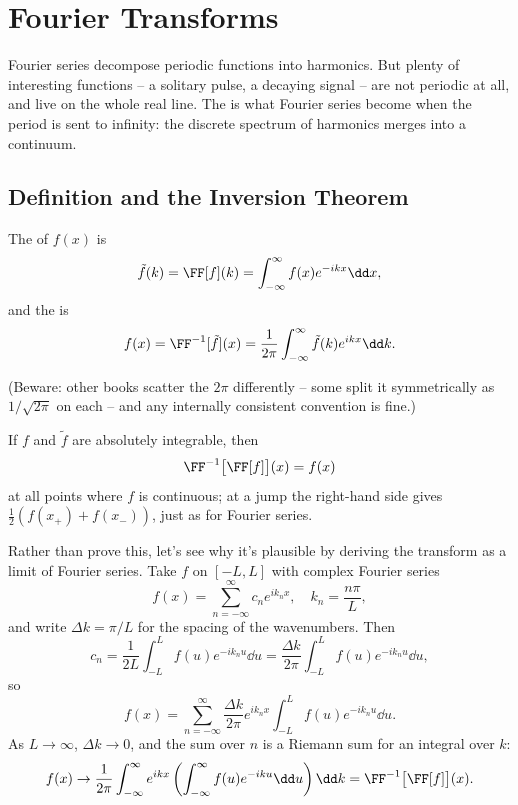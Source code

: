 \section{Fourier Transforms}

Fourier series decompose periodic functions into harmonics. But plenty of interesting functions -- a solitary pulse, a decaying signal -- are not periodic at all, and live on the whole real line. The  is what Fourier series become when the period is sent to infinity: the discrete spectrum of harmonics merges into a continuum.

\subsection{Definition and the Inversion Theorem}

\begin{definition}
    The  of $f(x)$ is
    $$
    \tilde{f}(k) = \FF[f](k) = \int_{-\infty}^{\infty} f(x) e^{-ikx} \dd x,
    $$
    and the  is
    $$
    f(x) = \FF^{-1}[\tilde f](x) = \frac{1}{2\pi} \int_{-\infty}^{\infty} \tilde{f}(k) e^{ikx} \dd k.
    $$
\end{definition}

(Beware: other books scatter the $2\pi$ differently -- some split it symmetrically as $1/\sqrt{2\pi}$ on each -- and any internally consistent convention is fine.)

\begin{theorem}
    If $f$ and $\tilde f$ are absolutely integrable, then
    $$
    \FF^{-1}\big[\FF[f]\big](x) = f(x)
    $$
    at all points where $f$ is continuous; at a jump the right-hand side gives $\frac{1}{2}(f(x_+) + f(x_-))$, just as for Fourier series.
\end{theorem}

Rather than prove this, let's see why it's plausible by deriving the transform as a limit of Fourier series. Take $f$ on $[-L, L]$ with complex Fourier series
$$
f(x) = \sum_{n = -\infty}^{\infty} c_n e^{i k_n x}, \quad k_n = \frac{n \pi}{L},
$$
and write $\Delta k = \pi/L$ for the spacing of the wavenumbers. Then
$$
c_n = \frac{1}{2L}\int_{-L}^{L} f(u) e^{-i k_n u} \dd u = \frac{\Delta k}{2 \pi} \int_{-L}^L f(u) e^{-i k_n u} \dd u,
$$
so
$$
f(x) = \sum_{n = -\infty}^{\infty} \frac{\Delta k}{2 \pi} e^{i k_n x} \int_{-L}^{L} f(u) e^{-i k_n u} \dd u.
$$
As $L \rightarrow \infty$, $\Delta k \rightarrow 0$, and the sum over $n$ is a Riemann sum for an integral over $k$:
$$
f(x) \rightarrow \frac{1}{2 \pi}\int_{-\infty}^{\infty} e^{ikx}\left(\int_{-\infty}^{\infty} f(u) e^{-iku} \dd u\right) \dd k = \FF^{-1}\big[\FF [f]\big](x).
$$

